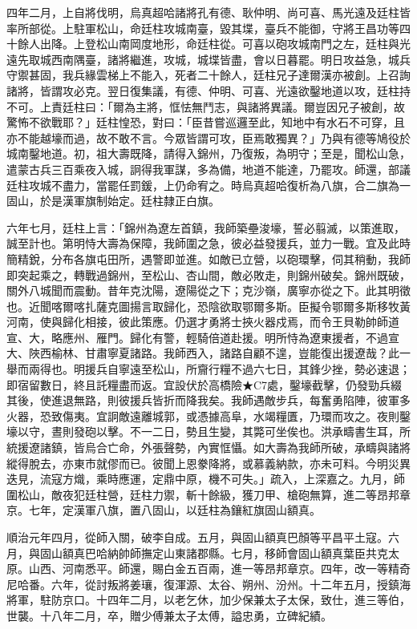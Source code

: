 \begin{pinyinscope}
四年二月，上自將伐明，烏真超哈諸將孔有德、耿仲明、尚可喜、馬光遠及廷柱皆率所部從。上駐軍松山，命廷柱攻城南臺，毀其堞，臺兵不能御，守將王昌功等四十餘人出降。上登松山南岡度地形，命廷柱從。可喜以砲攻城南門之左，廷柱與光遠先取城西南隅臺，諸將繼進，攻城，城堞皆盡，會以日暮罷。明日攻益急，城兵守禦甚固，我兵緣雲梯上不能入，死者二十餘人，廷柱兄子達爾漢亦被創。上召詢諸將，皆謂攻必克。翌日復集議，有德、仲明、可喜、光遠欲鑿地道以攻，廷柱持不可。上責廷柱曰：「爾為主將，恇怯無鬥志，與諸將異議。爾豈因兄子被創，故驚怖不欲戰耶？」廷柱惶恐，對曰：「臣昔嘗巡邏至此，知地中有水石不可穿，且亦不能越壕而過，故不敢不言。今眾皆謂可攻，臣焉敢獨異？」乃與有德等鳩役於城南鑿地道。初，祖大壽既降，請得入錦州，乃復叛，為明守；至是，聞松山急，遣蒙古兵三百乘夜入城，詗得我軍謀，多為備，地道不能達，乃罷攻。師還，部議廷柱攻城不盡力，當罷任罰鍰，上仍命宥之。時烏真超哈復析為八旗，合二旗為一固山，於是漢軍旗制始定。廷柱隸正白旗。

六年七月，廷柱上言：「錦州為遼左首鎮，我師築壘浚壕，誓必翦滅，以策進取，誠至計也。第明恃大壽為保障，我師圍之急，彼必益發援兵，並力一戰。宜及此時簡精銳，分布各旗屯田所，遇警即並進。如敵已立營，以砲環擊，伺其稍動，我師即突起乘之，轉戰過錦州，至松山、杏山間，敵必敗走，則錦州破矣。錦州既破，關外八城聞而震動。昔年克沈陽，遼陽從之下；克沙嶺，廣寧亦從之下。此其明徵也。近聞喀爾喀扎薩克圖揚言取歸化，恐陰欲取鄂爾多斯。臣擬令鄂爾多斯移牧黃河南，使與歸化相接，彼此策應。仍選才勇將士挾火器戍焉，而令王貝勒帥師道宣、大，略應州、雁門。歸化有警，輕騎倍道赴援。明所恃為遼東援者，不過宣大、陜西榆林、甘肅寧夏諸路。我師西入，諸路自顧不遑，豈能復出援遼哉？此一舉而兩得也。明援兵自寧遠至松山，所齎行糧不過六七日，其鋒少挫，勢必速退；即宿留數日，終且託糧盡而返。宜設伏於高橋險★C7處，鑿壕截擊，仍發勁兵綴其後，使進退無路，則彼援兵皆折而降我矣。我師遇敵步兵，每奮勇陷陣，彼軍多火器，恐致傷夷。宜詗敵遠離城郭，或憑據高阜，水竭糧匱，乃環而攻之。夜則鑿壕以守，晝則發砲以擊。不一二日，勢且生變，其斃可坐俟也。洪承疇書生耳，所統援遼諸鎮，皆烏合亡命，外張聲勢，內實恇懾。如大壽為我師所破，承疇與諸將縱得脫去，亦東市就僇而已。彼聞上恩豢降將，或慕義納款，亦未可料。今明災異迭見，流寇方熾，乘時應運，定鼎中原，機不可失。」疏入，上深嘉之。九月，師圍松山，敵夜犯廷柱營，廷柱力禦，斬十餘級，獲刀甲、槍砲無算，進二等昂邦章京。七年，定漢軍八旗，置八固山，以廷柱為鑲紅旗固山額真。

順治元年四月，從師入關，破李自成。五月，與固山額真巴顏等平昌平土寇。六月，與固山額真巴哈納帥師撫定山東諸郡縣。七月，移師會固山額真葉臣共克太原。山西、河南悉平。師還，賜白金五百兩，進一等昂邦章京。四年，改一等精奇尼哈番。六年，從討叛將姜瓖，復渾源、太谷、朔州、汾州。十二年五月，授鎮海將軍，駐防京口。十四年二月，以老乞休，加少保兼太子太保，致仕，進三等伯，世襲。十八年二月，卒，贈少傅兼太子太傅，謚忠勇，立碑紀績。


\end{pinyinscope}
